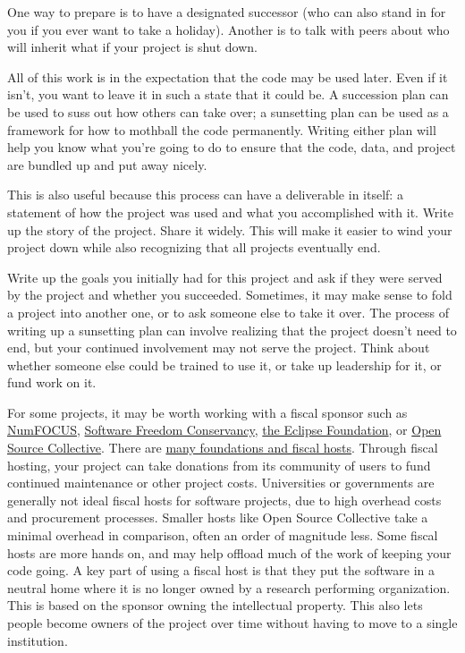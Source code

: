 \documentclass[10pt,letterpaper]{article}
\begin{document}
  One way to prepare is to have a designated successor
  (who can also stand in for you if you ever want to take a holiday).
  Another is to talk with peers about who will inherit what if your project is shut down.

All of this work is in the expectation that the code may be used later.
Even if it isn't,
you want to leave it in such a state that it could be.
A succession plan can be used to suss out how others can take over;
a sunsetting plan can be used as a framework for how to mothball the code permanently.
Writing either plan will help you know what you're going to do to ensure that the code,
data,
and project are bundled up and put away nicely.

This is also useful because this process can have a deliverable in itself:
a statement of how the project was used and what you accomplished with it.
Write up the story of the project.
Share it widely.
This will make it easier to wind your project down
while also recognizing that all projects eventually end.

Write up the goals you initially had for this project
and ask if they were served by the project and whether you succeeded.
Sometimes,
it may make sense to fold a project into another one,
or to ask someone else to take it over.
The process of writing up a sunsetting plan can involve realizing that
the project doesn't need to end,
but your continued involvement may not serve the project.
Think about whether someone else could be trained to use it,
or take up leadership for it,
or fund work on it.

For some projects,
it may be worth working with a fiscal sponsor such as
\href{https://numfocus.org/}{NumFOCUS},
\href{https://sfconservancy.org/}{Software Freedom Conservancy},
\href{https://www.eclipse.org/}{the Eclipse Foundation},
or \href{https://oscollective.org/}{Open Source Collective}.
There are \href{https://sustainoss.org/academic-map/organizations/index.html}{many foundations and fiscal hosts}.
Through fiscal hosting,
your project can take donations from its community of users to fund continued maintenance or other project costs.
Universities or governments are generally not ideal fiscal hosts for software projects,
due to high overhead costs and procurement processes.
Smaller hosts like Open Source Collective take a minimal overhead in comparison,
often an order of magnitude less.
Some fiscal hosts are more hands on,
and may help offload much of the work of keeping your code going.
A key part of using a fiscal host is that
they put the software in a neutral home where it is no longer owned by a research performing organization.
This is based on the sponsor owning the intellectual property.
This also lets people become owners of the project over time
without having to move to a single institution.
\end{document}
